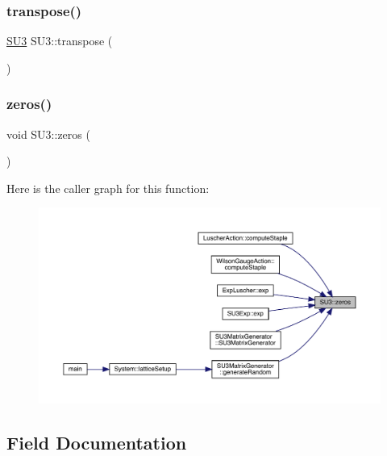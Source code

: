 \mbox{\label{class_s_u3_af0229a4940c6c4355a2994ccaa663d0e}} 
\subsubsection{\texorpdfstring{transpose()}{transpose()}}
{\footnotesize\ttfamily \mbox{\hyperlink{class_s_u3}{S\+U3}} S\+U3\+::transpose (\begin{DoxyParamCaption}{ }\end{DoxyParamCaption})}

\mbox{\label{class_s_u3_a9f3527fd882882ddfa18d72f5f43176c}} 
\subsubsection{\texorpdfstring{zeros()}{zeros()}}
{\footnotesize\ttfamily void S\+U3\+::zeros (\begin{DoxyParamCaption}{ }\end{DoxyParamCaption})}

Here is the caller graph for this function\+:
\nopagebreak
\begin{figure}[H]
\begin{center}
\leavevmode
\includegraphics[width=350pt]{class_s_u3_a9f3527fd882882ddfa18d72f5f43176c_icgraph}
\end{center}
\end{figure}


\subsection{Field Documentation}
\mbox{\label{class_s_u3_af003668305abe616f56568a075434be0}} 
